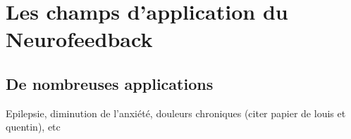 


\section{Les champs d'application du Neurofeedback} \label{applications_NFB}

\subsection{De nombreuses applications}
Epilepsie, diminution de l’anxiété, douleurs chroniques (citer papier de louis et quentin), etc

